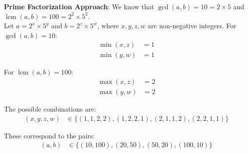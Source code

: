 \documentclass[12pt]{article}
\begin{document}
\textbf{Prime Factorization Approach}: We know that $\gcd(a, b) = 10 = 2 \times 5$ and $\operatorname{lcm}(a, b) = 100 = 2^2 \times 5^2$. \\

Let $a = 2^x \times 5^y$ and $b = 2^z \times 5^w$, where $x, y, z, w$ are non-negative integers.
For $\gcd(a, b) = 10$:
\begin{align*}
    \min(x, z) &= 1 \\
    \min(y, w) &= 1
\end{align*}

For $\operatorname{lcm}(a, b) = 100$:
\begin{align*}
    \max(x, z) &= 2 \\
    \max(y, w) &= 2
\end{align*}

The possible combinations are:
\begin{align*}
    (x, y, z, w) &\in \{(1, 1, 2, 2), (1, 2, 2, 1), (2, 1, 1, 2), (2, 2, 1, 1)\}
\end{align*}

These correspond to the pairs:
\begin{align*}
    (a, b) &\in \{(10, 100), (20, 50), (50, 20), (100, 10)\}
\end{align*}
\end{document}
